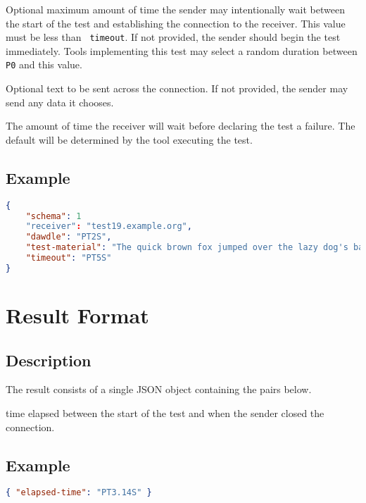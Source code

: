 \documentclass[10pt]{article}
\begin{document}
 Optional maximum amount of time the sender
may intentionally wait between the start of the test and establishing
the connection to the receiver.  This value must be less than {\tt
timeout}.  If not provided, the sender should begin the test
immediately.  Tools implementing this test may select a random
duration between {\tt P0} and this value.

 Optional text to be sent across the
connection.  If not provided, the sender may send any data it chooses.

 The amount of time the receiver will wait
before declaring the test a failure.  The default will be determined
by the tool executing the test.


\subsection{Example}
\begin{lstlisting}[language=json]
{
    "schema": 1
    "receiver": "test19.example.org",
    "dawdle": "PT2S",
    "test-material": "The quick brown fox jumped over the lazy dog's back.",
    "timeout": "PT5S"
}
\end{lstlisting}



%
%

\section{Result Format}

\subsection{Description}
The result consists of a single JSON object containing the pairs
below.  \seejson

 time elapsed between the start of the test
and when the sender closed the connection.


\subsection{Example}
\begin{lstlisting}[language=json]
{ "elapsed-time": "PT3.14S" }
\end{lstlisting}
\end{document}
